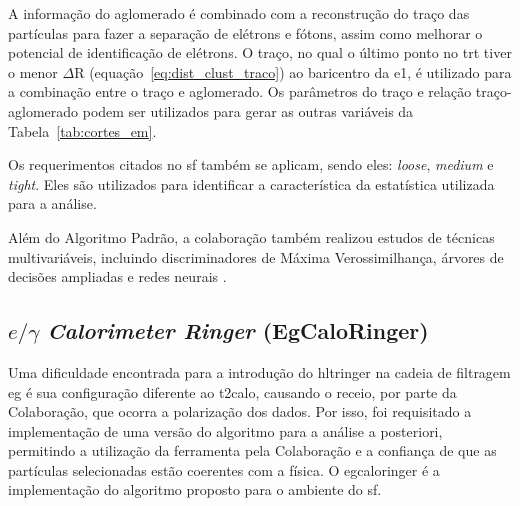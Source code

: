A informação do aglomerado é combinado com a reconstrução do traço
\cite{physics_perf_expected} das partículas para fazer a separação de elétrons e fótons, assim como melhorar o
potencial de identificação de elétrons. O traço, no qual o último ponto no
\gls{trt} tiver o menor $\Delta\text{R}$ (equação~\ref{eq:dist_clust_traco}) ao baricentro da \gls{e1}, 
é utilizado para a combinação entre o traço e aglomerado. Os parâmetros do traço
e relação traço-aglomerado podem ser utilizados para gerar as outras variáveis
da Tabela~\ref{tab:cortes_em}.

Os requerimentos citados no \gls{sf} também se aplicam, sendo eles: \emph{loose}, 
\emph{medium} e \emph{tight}. Eles são utilizados para
identificar a característica da estatística utilizada para a análise.

Além do Algoritmo Padrão, a colaboração também realizou estudos de técnicas
multivariáveis, incluindo discriminadores de Máxima Verossimilhança, árvores 
de decisões ampliadas e redes neurais \cite{physics_perf_expected}.


\subsection{\texorpdfstring{$e/\gamma$ \emph{Calorimeter Ringer}
(EgCaloRinger)}{eGamma Calorimeter Ringer (EgCaloRinger)}}
\label{ssec:egringer}

Uma dificuldade encontrada para a introdução do \gls{hltringer} na cadeia de
filtragem \gls{eg} é sua configuração diferente ao \gls{t2calo}, causando o
receio, por parte da Colaboração, que ocorra a polarização dos dados. Por isso, foi requisitado a
implementação de uma versão do algoritmo para a análise a posteriori, permitindo
a utilização da ferramenta pela Colaboração e a confiança de que as partículas
selecionadas estão coerentes com a física. O \gls{egcaloringer} é a
implementação do algoritmo proposto para o ambiente do \gls{sf}.

